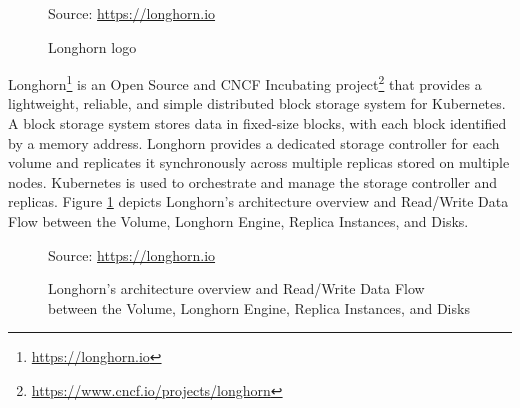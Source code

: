 \begin{figure} %
  \centering
  \def\stackalignment{r} %
  {\scriptsize \parbox[t]{\linewidth}{ Source: \url{https://longhorn.io}} }
  \caption{Longhorn logo}
\end{figure}

Longhorn\footnote{\url{https://longhorn.io}} is an Open Source and CNCF Incubating
project\footnote{\url{https://www.cncf.io/projects/longhorn}} that provides a lightweight,
reliable, and simple distributed block storage system for Kubernetes\cite{longhorn}.
A block storage system stores data in fixed-size blocks, with each block
identified by a memory address\cite{block_storage}. Longhorn provides a
dedicated storage controller for each volume and replicates it synchronously
across multiple replicas stored on multiple nodes. Kubernetes is used to orchestrate
and manage the storage controller and replicas\cite{longhorn_architecture}. Figure
\ref{fig:longhorn} depicts Longhorn's architecture overview and Read/Write Data Flow
between the Volume, Longhorn Engine, Replica Instances, and Disks.

\begin{figure}[htbp]
  \centering
  \def\stackalignment{r} %
  {\scriptsize Source: \url{https://longhorn.io} }
  \caption{Longhorn's
  architecture
  overview
  and
  Read/Write
  Data
  Flow
  between
  the
  Volume,
  Longhorn
  Engine,
  Replica
  Instances,
  and
  Disks}
  \label{fig:longhorn}
\end{figure}

